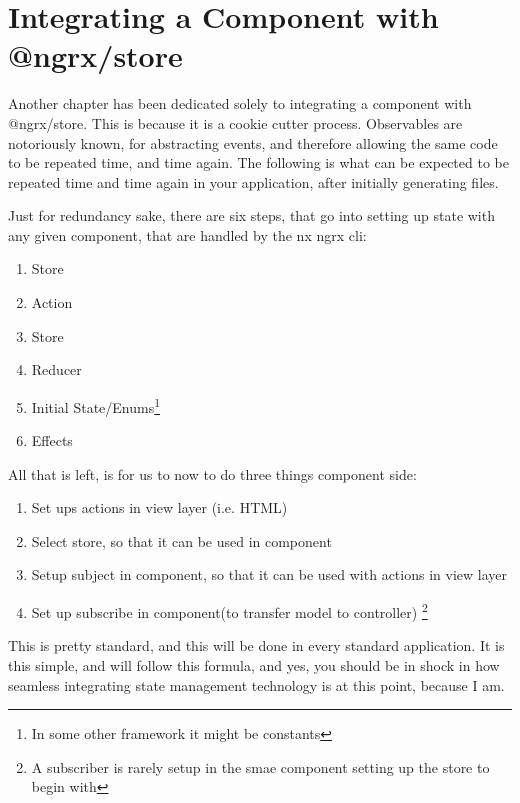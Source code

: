 \maketitle{}
\section{ Integrating a Component with @ngrx/store }

Another chapter has been dedicated solely to integrating a component
with @ngrx/store. This is because it is a cookie cutter process. Observables
are notoriously known, for abstracting events, and therefore allowing the same
code to be repeated time, and time again. The following is what can be expected
to be repeated time and time again in your application, after initially
generating files.

Just for redundancy sake, there are six steps, that go into setting up state
with any given component, that are handled by the nx ngrx cli:
\begin{enumerate}
  \item Store
  \item Action
  \item Store
  \item Reducer
  \item Initial State/Enums\footnote{In some other framework it might be constants}
  \item Effects
\end{enumerate}

All that is left, is for us to now to do three things component side:

\begin{enumerate}
  \item Set ups actions in view layer (i.e. HTML)
  \item Select store, so that it can be used in component
  \item Setup subject in component, so that it can be used with actions in view layer
  \item Set up subscribe in component(to transfer model to controller) \footnote{A subscriber is rarely setup in the smae component setting up the store to begin with}
\end{enumerate}

This is pretty standard, and this will be done in every standard application.
It is this simple, and will follow this formula, and yes, you should be in shock
in how seamless integrating state management technology is at this point,
because I am.


